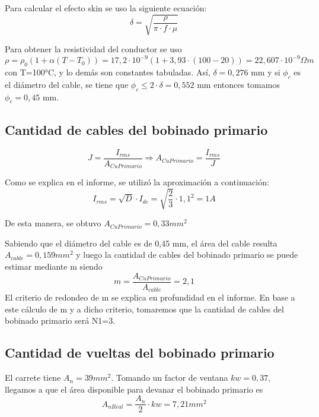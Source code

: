 \documentclass{article}
\begin{document}
Para calcular el efecto skin se uso la siguiente ecuación:
\begin{equation*}
    \delta = \sqrt{\frac{\rho}{\pi \cdot f \cdot \mu}}
    \label{eq:Skin}
\end{equation*}

Para obtener la resistividad del conductor se uso
\begin{equation*}
    \rho = \rho_0 (1 + \alpha (T - T_0)) = 17,2 \cdot 10^{-9} ( 1 + 3,93 \cdot (100 - 20)) = 22,607 \cdot 10^{-9} \Omega m
\end{equation*}
con T=100°C, y lo demás son constantes tabuladas. Así, $ \delta = 0,276 $ mm y si $ \phi_c $ es el diámetro del cable, se tiene que $ \phi_c \leq 2 \cdot \delta = 0,552 $ mm entonces tomamos $ \phi_c = 0,45 $ mm.


\subsection{Cantidad de cables del bobinado primario}

\begin{equation*}
    J = \frac{I_{rms}}{A_{CuPrimario}} \Rightarrow A_{CuPrimario}=\frac{I_{rms}}{J}
\end{equation*}

Como se explica en el informe, se utilizó la aproximación a continuación:
\begin{equation*}
    I_{rms} = \sqrt{D} \cdot I_{dc} = \sqrt{\frac{2}{3}} \cdot 1,1^2 = 1 A
\end{equation*}

De esta manera, se obtuvo $ A_{CuPrimario} = 0,33 mm^2 $ 

Sabiendo que el diámetro del cable es de 0,45 mm, el área del cable resulta $ A_{cable} = 0,159 mm^2 $ y luego la cantidad de cables del bobinado primario se puede estimar mediante m siendo
\begin{equation}
    m = \frac{A_{CuPrimario}}{A_{cable}} = 2,1
    \label{eq:CablesParalelo}
\end{equation}
El criterio de redondeo de m se explica en profundidad en el informe. En base a este cálculo de m y a dicho criterio, tomaremos que la cantidad de cables del bobinado primario será N1=3.

\subsection{Cantidad de vueltas del bobinado primario}
El carrete tiene $ A_n = 39 mm^2 $. Tomando un factor de ventana $kw=0,37$,  llegamos a que el área disponible para devanar el bobinado primario es
\begin{equation*}
    A_{nReal}=\frac{A_n}{2} \cdot kw = 7,21 mm^2
\end{equation*}
\end{document}
